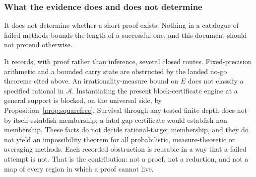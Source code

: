\subsubsection*{What the evidence does and does not determine}

It does not determine whether a short proof exists. Nothing in a catalogue of failed methods
bounds the length of a successful one, and this document should not pretend otherwise.

It records, with proof rather than inference, several closed routes. Fixed-precision arithmetic
and a bounded carry state are obstructed by the landed no-go theorems cited above. An
irrationality-measure bound on $E$ does not classify a specified rational in $\mathcal{A}$.
Instantiating the present block-certificate engine at a general support is blocked, on the
universal side, by Proposition~\ref{prop:squarefree}. Survival through any tested finite depth does
not by itself establish membership; a fatal-gap certificate would establish non-membership. These
facts do not decide rational-target membership, and they do not yield an impossibility theorem for
all probabilistic, measure-theoretic or averaging methods. Each recorded obstruction is reusable
in a way that a failed attempt is not. That is the contribution: not a proof, not a reduction, and
not a map of every region in which a proof cannot live.

